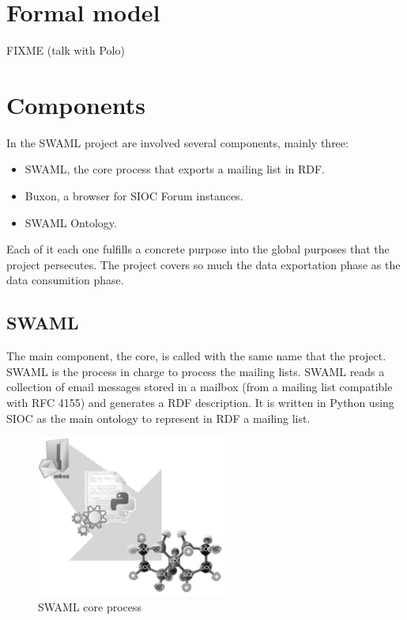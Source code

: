 \documentclass{llncs}
\begin{document}
\section{Formal model}

FIXME (talk with Polo)

\section{Components}

In the SWAML project are involved several components, mainly three:

\begin{itemize}
 \item SWAML, the core process that exports a mailing list in RDF.
 \item Buxon, a browser for SIOC Forum instances.
 \item SWAML Ontology.
\end{itemize}

Each of it each one fulfills a concrete purpose into the global purposes that 
the project persecutes. The project covers so much the data exportation phase 
as the data consumition phase.

\subsection{SWAML}

The main component, the core, is called with the same name that the project. SWAML is
the process in charge to process the mailing lists. SWAML reads a collection of email 
messages stored in a mailbox (from a mailing list compatible with RFC 4155) and generates 
a RDF description. It is written in Python using SIOC as the main ontology to represent 
in RDF a mailing list.

\begin{figure}[ht]
 \centering
 \includegraphics[bb=0 0 238 200]{images/swaml-process.png}
 \caption{SWAML core process}
\end{figure}
\end{document}
